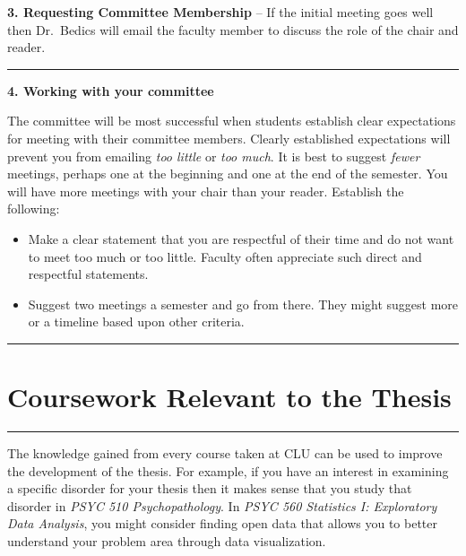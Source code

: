 \documentclass[openany]{book}
\begin{document}
\textbf{3. Requesting Committee Membership} -- If the initial meeting goes well then Dr.~Bedics will email the faculty member to discuss the role of the chair and reader.

\begin{center}\rule{0.5\linewidth}{0.5pt}\end{center}

\textbf{4. Working with your committee}

The committee will be most successful when students establish clear expectations for meeting with their committee members. Clearly established expectations will prevent you from emailing \emph{too little} or \emph{too much}. It is best to suggest \emph{fewer} meetings, perhaps one at the beginning and one at the end of the semester. You will have more meetings with your chair than your reader. Establish the following:

\begin{itemize}
\item
  Make a clear statement that you are respectful of their time and do not want to meet too much or too little. Faculty often appreciate such direct and respectful statements.
\item
  Suggest two meetings a semester and go from there. They might suggest more or a timeline based upon other criteria.
\end{itemize}

\begin{center}\rule{0.5\linewidth}{0.5pt}\end{center}

\hypertarget{coursework-relevant-to-the-thesis}{%
\chapter{Coursework Relevant to the Thesis}\label{coursework-relevant-to-the-thesis}}

\begin{center}\rule{0.5\linewidth}{0.5pt}\end{center}

The knowledge gained from every course taken at CLU can be used to improve the development of the thesis. For example, if you have an interest in examining a specific disorder for your thesis then it makes sense that you study that disorder in \emph{PSYC 510 Psychopathology}. In \emph{PSYC 560 Statistics I: Exploratory Data Analysis}, you might consider finding open data that allows you to better understand your problem area through data visualization.
\end{document}
